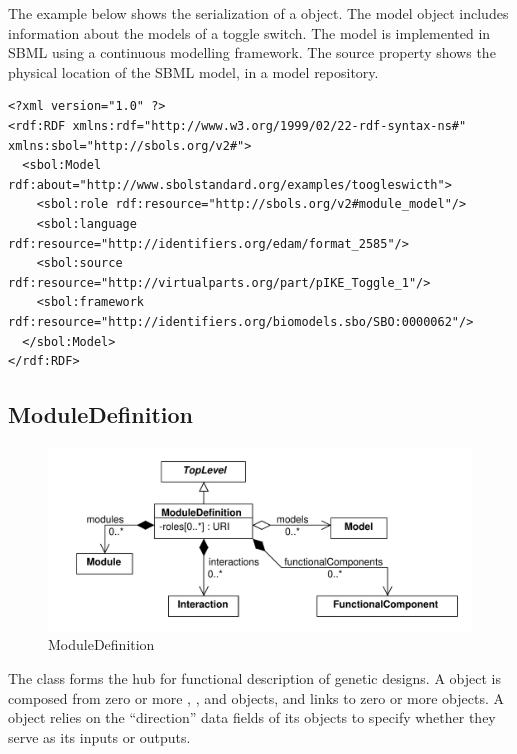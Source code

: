 The example below shows the serialization of a  object. The model object includes information about the models of a toggle switch. The model is implemented in SBML using a continuous modelling framework. The source property shows the physical location of the SBML model, in a model repository. 
\begin{lstlisting}
<?xml version="1.0" ?>
<rdf:RDF xmlns:rdf="http://www.w3.org/1999/02/22-rdf-syntax-ns#" xmlns:sbol="http://sbols.org/v2#">
  <sbol:Model rdf:about="http://www.sbolstandard.org/examples/toogleswicth">
    <sbol:role rdf:resource="http://sbols.org/v2#module_model"/>
    <sbol:language rdf:resource="http://identifiers.org/edam/format_2585"/>
    <sbol:source rdf:resource="http://virtualparts.org/part/pIKE_Toggle_1"/>
    <sbol:framework rdf:resource="http://identifiers.org/biomodels.sbo/SBO:0000062"/>
  </sbol:Model>
</rdf:RDF>

\end{lstlisting}
\label{ser:Model}



\subsection{ModuleDefinition}
\label{sec:ModuleDefinition}

\begin{figure}[ht]
\begin{center}
\includegraphics[scale=0.6]{uml/module_definition}
\caption[]{ModuleDefinition}
\label{uml:module_definition}
\end{center}
\end{figure}

The  class forms the hub for functional description of genetic designs. A  object is composed from zero or more , , and  objects, and links to zero or more  objects. A  object relies on the ``direction'' data fields of its  objects to specify whether they serve as its inputs or outputs.

